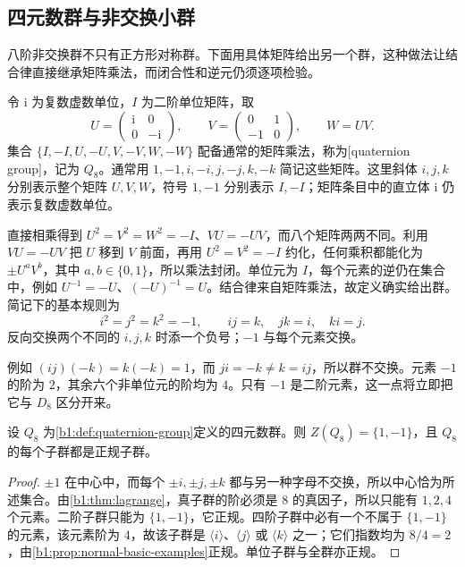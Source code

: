\subsection{四元数群与非交换小群}
\label{b1:subsec:0303:02}

八阶非交换群不只有正方形对称群。下面用具体矩阵给出另一个群，这种做法让结合律直接继承矩阵乘法，而闭合性和逆元仍须逐项检验。

\begin{definition}\label{b1:def:quaternion-group}
	令 \(\mathrm i\) 为复数虚数单位，\(I\) 为二阶单位矩阵，取
	\[
		U=\begin{pmatrix}\mathrm i&0\\0&-\mathrm i\end{pmatrix},\qquad
		V=\begin{pmatrix}0&1\\-1&0\end{pmatrix},\qquad W=UV.
	\]
	集合 \(\{I,-I,U,-U,V,-V,W,-W\}\) 配备通常的矩阵乘法，称为[quaternion group]，记为 \(Q_8\)。通常用 \(1,-1,i,-i,j,-j,k,-k\) 简记这些矩阵。这里斜体 \(i,j,k\) 分别表示整个矩阵 \(U,V,W\)，符号 \(1,-1\) 分别表示 \(I,-I\)；矩阵条目中的直立体 \(\mathrm i\) 仍表示复数虚数单位。
\end{definition}

直接相乘得到 \(U^2=V^2=W^2=-I\)、\(VU=-UV\)，而八个矩阵两两不同。利用 \(VU=-UV\) 把 \(U\) 移到 \(V\) 前面，再用 \(U^2=V^2=-I\) 约化，任何乘积都能化为 \(\pm U^aV^b\)，其中 \(a,b\in\{0,1\}\)，所以乘法封闭。单位元为 \(I\)，每个元素的逆仍在集合中，例如 \(U^{-1}=-U\)、\((-U)^{-1}=U\)。结合律来自矩阵乘法，故定义确实给出群。简记下的基本规则为
\begin{equation}\label{b1:eq:quaternion-relations}
	i^2=j^2=k^2=-1,\qquad ij=k,\quad jk=i,\quad ki=j.
\end{equation}
反向交换两个不同的 \(i,j,k\) 时添一个负号；\(-1\) 与每个元素交换。

\ProseParagraphBreak
例如 \((ij)(-k)=k(-k)=1\)，而 \(ji=-k\ne k=ij\)，所以群不交换。元素 \(-1\) 的阶为 \(2\)，其余六个非单位元的阶均为 \(4\)。只有 \(-1\) 是二阶元素，这一点将立即把它与 \(D_8\) 区分开来。

\begin{proposition}\label{b1:prop:quaternion-subgroups}
	设 \(Q_8\) 为\cref{b1:def:quaternion-group}定义的四元数群。则 \(Z(Q_8)=\{1,-1\}\)，且 \(Q_8\) 的每个子群都是正规子群。
\end{proposition}
\begin{proof}
	\(\pm1\) 在中心中，而每个 \(\pm i,\pm j,\pm k\) 都与另一种字母不交换，所以中心恰为所述集合。由\cref{b1:thm:lagrange}，真子群的阶必须是 \(8\) 的真因子，所以只能有 \(1,2,4\) 个元素。二阶子群只能为 \(\{1,-1\}\)，它正规。四阶子群中必有一个不属于 \(\{1,-1\}\) 的元素，该元素阶为 \(4\)，故该子群是 \(\langle i\rangle\)、\(\langle j\rangle\) 或 \(\langle k\rangle\) 之一；它们指数均为 \(8/4=2\)，由\cref{b1:prop:normal-basic-examples}正规。单位子群与全群亦正规。
\end{proof}

